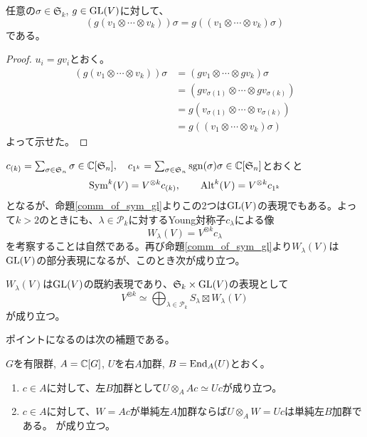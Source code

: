 \documentclass{ltjsreport}
\begin{document}
\begin{prop}\label{comm_of_sym_gl}
  任意の$\sigma\in\mathfrak{S}_k$, $g\in\text{GL}(V)$に対して、
  \[
  (g(v_1\otimes\cdots\otimes v_k))\sigma
  =
  g ((v_1\otimes\cdots\otimes v_k)\sigma)
  \]
  である。
\end{prop}

\begin{proof}
  $u_i=gv_i$とおく。
  \begin{align*}
    (g(v_1\otimes\cdots\otimes v_k))\sigma
    &=(gv_1\otimes\cdots\otimes gv_k)\sigma\\
    &=(gv_{\sigma(1)}\otimes\cdots\otimes gv_{\sigma(k)})\\
    &=g(v_{\sigma(1)}\otimes\cdots\otimes v_{\sigma(k)})\\
    &=g((v_1\otimes\cdots\otimes v_k)\sigma)
  \end{align*}
  よって示せた。
\end{proof}

$c_{(k)}=\sum_{\sigma\in \mathfrak{S}_n}\sigma\in\mathbb{C}[\mathfrak{S}_n],\quad c_{1^k}=\sum_{\sigma\in \mathfrak{S}_n}\mathrm{sgn}(\sigma)\sigma\in\mathbb{C}[\mathfrak{S}_n]$とおくと
\[
\text{Sym}^k(V)=V^{\otimes k}c_{(k)},\qquad\text{Alt}^k(V)=V^{\otimes k}c_{1^k}
\]
となるが、命題\ref{comm_of_sym_gl}よりこの2つは$\text{GL}(V)$の表現でもある。よって$k>2$のときにも、$\lambda\in\mathcal{P}_k$に対するYoung対称子$c_\lambda$による像
\[
W_\lambda(V)=V^{\otimes k}c_\lambda   
\]
を考察することは自然である。再び命題\ref{comm_of_sym_gl}より$W_\lambda(V)$は$\text{GL}(V)$の部分表現になるが、このとき次が成り立つ。

\begin{theo}\label{schur_weyl}
  $W_\lambda(V)$は$\text{GL}(V)$の既約表現であり、$\mathfrak{S}_k\times\text{GL}(V)$の表現として
  \[
  V^{\otimes k}\simeq \bigoplus_{\lambda\in\mathcal{P}_k}S_\lambda\boxtimes W_\lambda(V)  
  \]
  が成り立つ。
\end{theo}


ポイントになるのは次の補題である。

\begin{lemm}\label{DCT}
  $G$を有限群, $A=\mathbb{C}[G]$, $U$を右$A$加群, $B=\text{End}_A(U)$とおく。
  \begin{enumerate}
    \item $c\in A$に対して、左$B$加群として$U\otimes_AAc\simeq Uc$が成り立つ。
    \item $c\in A$に対して、$W=Ac$が単純左$A$加群ならば$U\otimes_AW=Uc$は単純左$B$加群である。
    が成り立つ。
  \end{enumerate}
\end{lemm}
\end{document}
